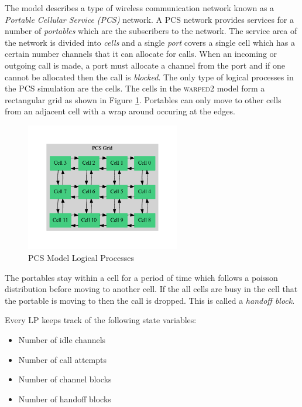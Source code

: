 \documentclass[11pt]{book}
\begin{document}
The model describes a type of wireless communication network known as a \emph{Portable Cellular
Service (PCS)} network.  A PCS network provides services for a number of \emph{portables} which
are the subscribers to the network.  The service area of the network is divided into
\emph{cells} and a single \emph{port} covers a single cell which has a certain number channels that
it can allocate for calls.  When an incoming or outgoing call is made, a port must allocate
a channel from the port and if one cannot be allocated then the call is \emph{blocked}\cite{lin-96b}.
The only type of logical processes in the PCS simulation are the cells.  The cells in the
\textsc{warped2} model form a rectangular grid as shown in Figure \ref{pcs_model_lps}.
Portables can only move to other cells from an adjacent cell with a wrap around occuring
at the edges.

\begin{figure}
    \centering
    \includegraphics[width=0.6\textwidth,quiet]{figs/graphviz/pcs_model.pdf}
    \caption{PCS Model Logical Processes}\label{pcs_model_lps}
\end{figure}

The portables stay within a cell for a period of time which follows a poisson distribution
before moving to another cell.  If the all cells are busy in the cell that the portable
is moving to then the call is dropped.  This is called a \emph{handoff block}.

Every LP keeps track of the following state variables:
\begin{itemize}
    \item Number of idle channels
    \item Number of call attempts
    \item Number of channel blocks
    \item Number of handoff blocks
\end{itemize}
\end{document}
